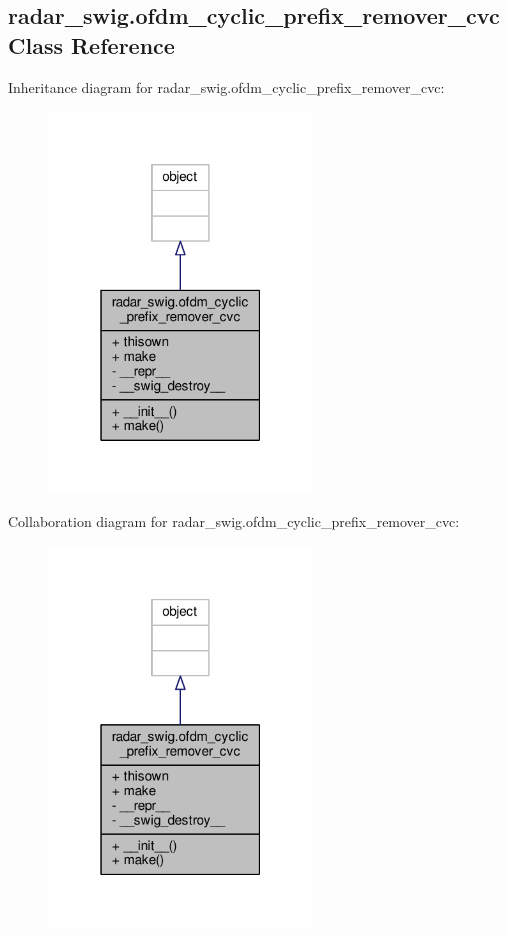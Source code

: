 \subsection{radar\+\_\+swig.\+ofdm\+\_\+cyclic\+\_\+prefix\+\_\+remover\+\_\+cvc Class Reference}
\label{classradar__swig_1_1ofdm__cyclic__prefix__remover__cvc}


Inheritance diagram for radar\+\_\+swig.\+ofdm\+\_\+cyclic\+\_\+prefix\+\_\+remover\+\_\+cvc\+:
\nopagebreak
\begin{figure}[H]
\begin{center}
\leavevmode
\includegraphics[width=199pt]{d7/d1c/classradar__swig_1_1ofdm__cyclic__prefix__remover__cvc__inherit__graph}
\end{center}
\end{figure}


Collaboration diagram for radar\+\_\+swig.\+ofdm\+\_\+cyclic\+\_\+prefix\+\_\+remover\+\_\+cvc\+:
\nopagebreak
\begin{figure}[H]
\begin{center}
\leavevmode
\includegraphics[width=199pt]{de/dcd/classradar__swig_1_1ofdm__cyclic__prefix__remover__cvc__coll__graph}
\end{center}
\end{figure}
